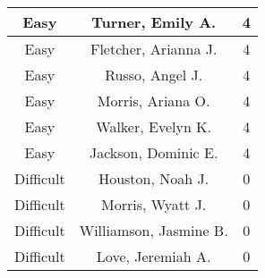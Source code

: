 \begin{center}
\begin{tabular}{|c|c|c|}
Easy       &Turner, Emily A.                              &4     \\ \hline
Easy       & Fletcher, Arianna J.                           &4          \\ \hline
Easy       & Russo, Angel J.                                &4\\ \hline
Easy       & Morris, Ariana O.                            &4    \\ \hline
Easy       & Walker, Evelyn K.                             &4   \\ \hline
Easy       & Jackson, Dominic E.                            &4     \\ \hline

Difficult       & Houston, Noah J.                         &0        \\ \hline
Difficult       & Morris, Wyatt J.                          &0       \\ \hline
Difficult       & Williamson, Jasmine B.                          &0          \\ \hline
Difficult       & Love, Jeremiah A.                       &0      \\ \hline

\end{tabular}
\end{center}






